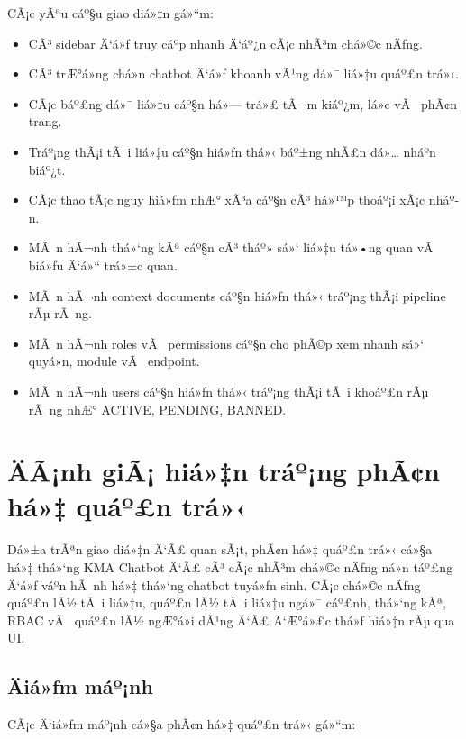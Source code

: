 ﻿\documentclass[12pt,a4paper]{report}
\begin{document}
CÃ¡c yÃªu cáº§u giao diá»‡n gá»“m:

\begin{itemize}
    \item CÃ³ sidebar Ä‘á»ƒ truy cáº­p nhanh Ä‘áº¿n cÃ¡c nhÃ³m chá»©c nÄƒng.
    \item CÃ³ trÆ°á»ng chá»n chatbot Ä‘á»ƒ khoanh vÃ¹ng dá»¯ liá»‡u quáº£n trá»‹.
    \item CÃ¡c báº£ng dá»¯ liá»‡u cáº§n há»— trá»£ tÃ¬m kiáº¿m, lá»c vÃ  phÃ¢n trang.
    \item Tráº¡ng thÃ¡i tÃ i liá»‡u cáº§n hiá»ƒn thá»‹ báº±ng nhÃ£n dá»… nháº­n biáº¿t.
    \item CÃ¡c thao tÃ¡c nguy hiá»ƒm nhÆ° xÃ³a cáº§n cÃ³ há»™p thoáº¡i xÃ¡c nháº­n.
    \item MÃ n hÃ¬nh thá»‘ng kÃª cáº§n cÃ³ tháº» sá»‘ liá»‡u tá»•ng quan vÃ  biá»ƒu Ä‘á»“ trá»±c quan.
    \item MÃ n hÃ¬nh context documents cáº§n hiá»ƒn thá»‹ tráº¡ng thÃ¡i pipeline rÃµ rÃ ng.
    \item MÃ n hÃ¬nh roles vÃ  permissions cáº§n cho phÃ©p xem nhanh sá»‘ quyá»n, module vÃ  endpoint.
    \item MÃ n hÃ¬nh users cáº§n hiá»ƒn thá»‹ tráº¡ng thÃ¡i tÃ i khoáº£n rÃµ rÃ ng nhÆ° ACTIVE, PENDING, BANNED.
\end{itemize}

\section{ÄÃ¡nh giÃ¡ hiá»‡n tráº¡ng phÃ¢n há»‡ quáº£n trá»‹}

Dá»±a trÃªn giao diá»‡n Ä‘Ã£ quan sÃ¡t, phÃ¢n há»‡ quáº£n trá»‹ cá»§a há»‡ thá»‘ng KMA Chatbot Ä‘Ã£ cÃ³ cÃ¡c nhÃ³m chá»©c nÄƒng ná»n táº£ng Ä‘á»ƒ váº­n hÃ nh há»‡ thá»‘ng chatbot tuyá»ƒn sinh. CÃ¡c chá»©c nÄƒng quáº£n lÃ½ tÃ i liá»‡u, quáº£n lÃ½ tÃ i liá»‡u ngá»¯ cáº£nh, thá»‘ng kÃª, RBAC vÃ  quáº£n lÃ½ ngÆ°á»i dÃ¹ng Ä‘Ã£ Ä‘Æ°á»£c thá»ƒ hiá»‡n rÃµ qua UI.

\subsection{Äiá»ƒm máº¡nh}

CÃ¡c Ä‘iá»ƒm máº¡nh cá»§a phÃ¢n há»‡ quáº£n trá»‹ gá»“m:
\end{document}
